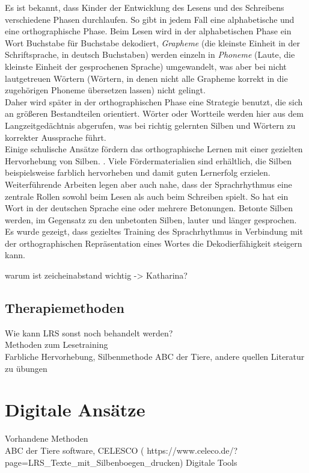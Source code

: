 Es ist bekannt, dass Kinder der Entwicklung des Lesens und des Schreibens verschiedene Phasen durchlaufen. So gibt in jedem Fall eine alphabetische und eine orthographische Phase. Beim Lesen wird in der alphabetischen Phase ein Wort Buchstabe für Buchstabe dekodiert, \textit{Grapheme} (die kleinste Einheit in der Schriftsprache, in deutsch Buchstaben) werden einzeln in \textit{Phoneme} (Laute, die kleinste Einheit der gesprochenen Sprache) umgewandelt, was aber bei nicht lautgetreuen Wörtern (Wörtern, in denen nicht alle Grapheme korrekt in die zugehörigen Phoneme übersetzen lassen) nicht gelingt.\\
Daher wird später in der orthographischen Phase eine Strategie benutzt, die sich an größeren Bestandteilen orientiert. Wörter oder Wortteile werden hier aus dem Langzeitgedächtnis abgerufen, was bei richtig gelernten Silben und Wörtern zu korrekter Aussprache führt. \cite{Steinbrink2014}\\
Einige schulische Ansätze fördern das orthographische Lernen mit einer gezielten Hervorhebung von Silben. .  Viele Fördermaterialien sind erhältlich, die Silben beispielsweise farblich hervorheben und damit guten Lernerfolg erzielen. 
Weiterführende Arbeiten legen aber auch nahe, dass der Sprachrhythmus eine zentrale Rollen sowohl beim Lesen als auch beim Schreiben spielt. So hat ein Wort in der deutschen Sprache eine oder mehrere Betonungen. Betonte Silben werden, im Gegensatz zu den unbetonten Silben, lauter und länger gesprochen. Es wurde gezeigt, dass gezieltes Training des Sprachrhythmus in Verbindung mit der orthographischen Repräsentation eines Wortes die Dekodierfähigkeit steigern kann. \cite{Brandelik2014}

warum ist zeicheinabstand wichtig -> Katharina?

\subsection{Therapiemethoden}

Wie kann LRS sonst noch behandelt werden?\\
Methoden zum Lesetraining\\
Farbliche Hervorhebung, Silbenmethode ABC der Tiere, andere quellen
Literatur zu übungen\\

\section{Digitale Ansätze}
Vorhandene Methoden\\
ABC der Tiere software, CELESCO ( https://www.celeco.de/?page=LRS\_Texte\_mit\_Silbenboegen\_drucken)
Digitale Tools\\

